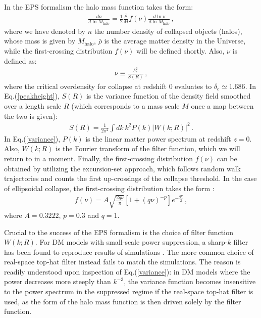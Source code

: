 \documentclass[12pt]{article}
\begin{document}
In the EPS formalism the halo mass function takes the form:
\begin{eqnarray}
\frac{dn}{d\ln M_{\text{halo}}} = \frac{1}{2}\frac{\bar{\rho}}{M}f(\nu)\frac{d\ln \nu}{d\ln M_{\text{halo}}} \, ,
\label{hmf}
\end{eqnarray}
%
where we have denoted by $n$ the number density of collapsed objects (halos), 
whose mass is given by $M_{\text{halo}}$, $\bar{\rho}$ is the average matter density in the Universe, while the first-crossing distribution 
$f(\nu)$ will be defined shortly. Also, $\nu$ is defined as:
%
\begin{eqnarray}
\nu \equiv \frac{\delta^2_c}{S(R)} \, ,
\label{peakheight}
\end{eqnarray}
%
where the critical overdensity for collapse at redshift 0 evaluates to $\delta_c \simeq 1.686$. In Eq.(\ref{peakheight}), 
$S(R)$ is the variance function of the density field smoothed over a length scale $R$
(which corresponds to a mass scale $M$ once a map between the two is given):
%
\begin{eqnarray}
S(R)  = \frac{1}{2\pi ^2}\int dk \ k^2P(k)|W(k;R)|^2 \, .
\label{variance}
\end{eqnarray}
%
In Eq.(\ref{variance}), $P(k)$ is the linear matter power spectrum at redshift $z=0$. Also, $W(k;R)$ is the Fourier transform of the filter function, which we will return to in a moment. Finally, the first-crossing distribution $f(\nu)$ can be obtained by utilizing the excursion-set approach, which follows random walk trajectories and counts the first up-crossings of the collapse threshold. In the case of ellipsoidal collapse, the first-crossing distribution takes the form \cite{smt}:
%
\begin{eqnarray}
f(\nu) = A\sqrt{\frac{2q\nu}{\pi}} \left [ 1 + (q\nu) ^{-p} \right ] e ^{-\frac{q\nu}{2}} \, ,
\label{firstc}
\end{eqnarray}
%
where $A = 0.3222$, $p = 0.3$ and $q = 1$.

Crucial to the success of the EPS formalism is the choice of filter function $W(k;R)$. For DM models with small-scale power suppression, a sharp-$k$ filter
has been found to reproduce results of simulations \cite{benson,s13,schneider}. The more common choice of real-space top-hat filter instead fails to match
the simulations. The reason is readily understood upon inspection of Eq.(\ref{variance}): in DM models where the power decreases more steeply than
$k^{-3}$, the variance function becomes insensitive to the power spectrum in the suppressed regime if the real-space top-hat filter is used, 
as the form of the halo mass function is then driven solely by the filter function.
\end{document}
